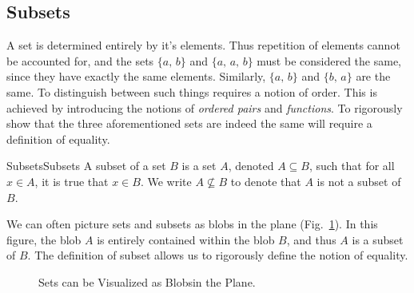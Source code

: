     \subsection{Subsets}
        A set is determined entirely by it's elements. Thus repetition of
        elements cannot be accounted for, and the sets $\{a,\,b\}$ and
        $\{a,\,a,\,b\}$ must be considered the same, since they have exactly
        the same elements. Similarly, $\{a,\,b\}$ and $\{b,\,a\}$ are the
        same. To distinguish between such things requires a notion of order.
        This is achieved by introducing the notions of \textit{ordered pairs}
        and \textit{functions}. To rigorously show that the three
        aforementioned sets are indeed the same will require a definition of
        equality.
        \begin{ldefinition}{Subsets}{Subsets}
            A \gls{subset} of a set $B$ is a set $A$, denoted $A\subseteq{B}$,
            such that for all $x\in{A}$, it is true that $x\in{B}$. We write
            $A\nsubseteq{B}$ to denote that $A$ is not a subset of $B$.
        \end{ldefinition}
        We can often picture sets and subsets as blobs in the plane
        (Fig.~\ref{fig:Subset_Blobs}). In this figure, the blob $A$ is
        entirely contained within the blob $B$, and thus $A$ is a subset of
        $B$. The definition of subset allows us to rigorously define the
        notion of equality.
        \begin{figure}[H]
            \centering
            
            \caption[Visual for Subsets]
                    {Sets can be Visualized as Blobsin the Plane.}
            \label{fig:Subset_Blobs}
        \end{figure}
